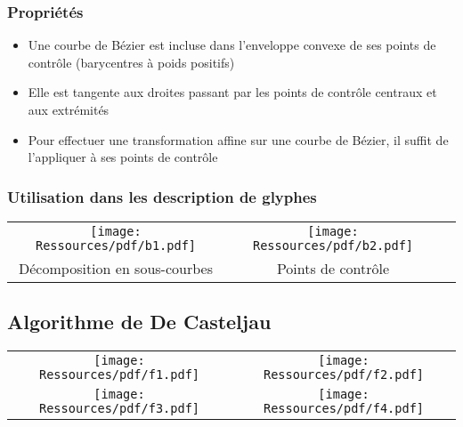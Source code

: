 \documentclass[french]{beamer}
\begin{document}
\begin{frame}
  \frametitle{Propriétés}

  \begin{itemize}

  \item
    Une courbe de Bézier est incluse dans l'enveloppe convexe de ses points de contrôle (barycentres à poids positifs)

  \item
    Elle est tangente aux droites passant par les points de contrôle centraux et aux extrémités

  \item
    Pour effectuer une transformation affine sur une courbe de Bézier, il suffit de l'appliquer à ses points de contrôle
    
  \end{itemize}
  
\end{frame}

\begin{frame}
  \frametitle{\small Utilisation dans les description de glyphes}
  
  \begin{tabular}{ccc}
    \texttt{[image: Ressources/pdf/b1.pdf]} &
    \texttt{[image: Ressources/pdf/b2.pdf]} \\
                    {\scriptsize Décomposition en sous-courbes} & {\scriptsize Points de contrôle} \\
  \end{tabular}
\end{frame}

\subsection{Algorithme de De Casteljau}

\begin{frame}
  
  \begin{center}
    \begin{tabular}{cc}
      \texttt{[image: Ressources/pdf/f1.pdf]} &
      \texttt{[image: Ressources/pdf/f2.pdf]} \\
      \texttt{[image: Ressources/pdf/f3.pdf]} & 
      \texttt{[image: Ressources/pdf/f4.pdf]} \\
    \end{tabular}
  \end{center}
  
\end{frame}
\end{document}

